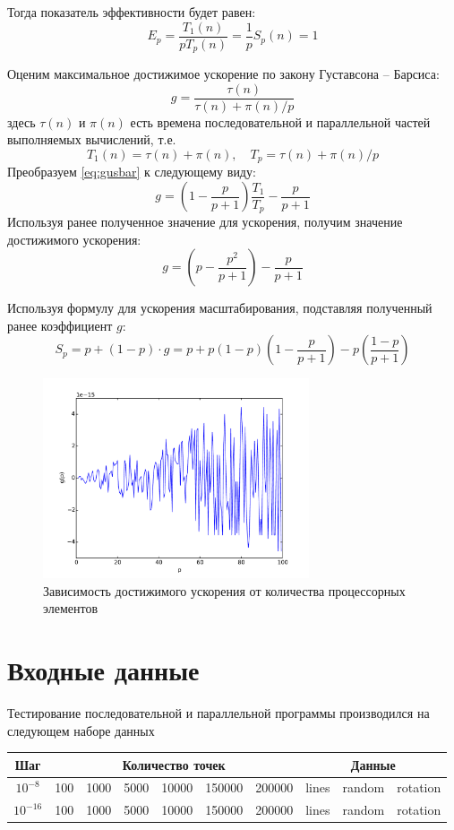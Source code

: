 \documentclass[14pt,final,titlepage,pscyr]{hedwork}
\begin{document}
Тогда показатель эффективности будет равен:
\[
	E_p = \frac{T_1(n)}{pT_p(n)} = \frac{1}{p}S_p(n) = 1
\]

Оценим максимальное достижимое ускорение по закону Густавсона -- Барсиса:
\begin{equation}
	g = \frac{\tau(n)}{\tau(n) + \pi(n) / p}
	\label{eq:gusbar}
\end{equation}
здесь \( \tau(n) \) и \( \pi(n) \) есть времена последовательной и параллельной частей выполняемых 
вычислений, т.е. 
\[
	T_1(n) = \tau(n) + \pi(n), \quad T_p = \tau(n) + \pi(n) / p
\]
Преобразуем \eqref{eq:gusbar} к следующему виду:
\[
	g = \left( 1 - \frac{p}{p+1} \right)\frac{T_1}{T_p} - \frac{p}{p+1}
\]
Используя ранее полученное значение для ускорения, получим значение достижимого ускорения:
\[
	g = \left( p - \frac{p^2}{p+1} \right) - \frac{p}{p+1}
\]

Используя формулу для ускорения масштабирования, подставляя полученный ранее коэффициент \( g \):
\[
	S_p = p + (1-p)\cdot g = p + p \left( 1 - p \right) \left( 1 - \frac{p}{p+1} \right) - 
		p\left( \frac{1-p}{p+1} \right)
\]

\begin{figure}[ht!]
    \center
    \includegraphics[width=0.7\textwidth]{g_p}
    \caption{Зависимость достижимого ускорения от количества процессорных элементов}
    \label{img:01}
\end{figure}

\newpage

\section{Входные данные}
	Тестирование последовательной и параллельной программы производился на следующем наборе данных
	\begin{table}[h]
		\begin{tabular}{|c|c|c|c|c|c|c|c|c|c|}
			\hline
			Шаг & \multicolumn{6}{c|}{Количество точек} & \multicolumn{3}{c|}{Данные} \\ \hline
			\( 10^{-8} \) & 100 & 1000 & 5000 & 10000 & 150000 & 200000 & lines & random & rotation \\ 
			\hline
			\( 10^{-16} \) & 100 & 1000 & 5000 & 10000 & 150000 & 200000 & lines & random & rotation \\ 
			\hline
		\end{tabular}
	\end{table}
\end{document}
